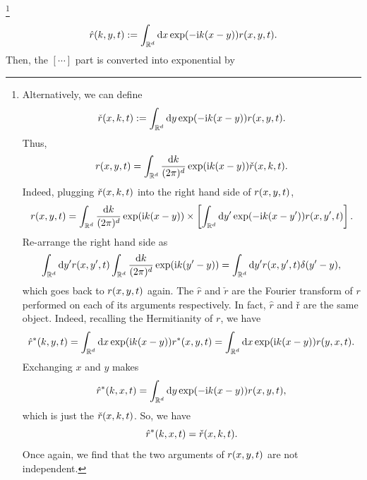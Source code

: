 \documentclass{book}
\newcommand{\assign}{:=}
\newcommand{\mathd}{\mathrm{d}}
\newcommand{\mathi}{\mathrm{i}}
\newcommand{\mathpi}{\pi}
\begin{document}
\footnote{Alternatively, we can define
\begin{equation}
  {\color[HTML]{000000}\check{r}  (x, k, t)} \assign \int_{\mathbb{R}^d}
  \mathd y \exp (- \mathi k (x - y)) {\color[HTML]{000000}r (x, y, t)} .
  \label{eq:r-fourier-alt}
\end{equation}
Thus,
\[ {\color[HTML]{000000}r (x, y, t)} = \int_{\mathbb{R}^d} \frac{\mathd k}{(2
   \mathpi)^d} \exp (\mathi k (x - y)) {\color[HTML]{000000}\check{r}  (x, k,
   t)} . \]
Indeed, plugging ${\color[HTML]{000000}\check{r}  (x, k, t)}$ into the right
hand side of ${\color[HTML]{000000}r (x, y, t)}$,
\[ {\color[HTML]{000000}r (x, y, t)} = \int_{\mathbb{R}^d} \frac{\mathd k}{(2
   \mathpi)^d} \exp (\mathi k (x - y)) \times \left[ \int_{\mathbb{R}^d}
   \mathd y' \exp (- \mathi k (x - y')) {\color[HTML]{000000}r (x, y', t)}
   \right] . \]
Re-arrange the right hand side as
\[ \int_{\mathbb{R}^d} \mathd y' {\color[HTML]{000000}r (x, y', t)}
   \int_{\mathbb{R}^d} \frac{\mathd k}{(2 \mathpi)^d} \exp (\mathi k (y' - y))
   = \int_{\mathbb{R}^d} \mathd y' {\color[HTML]{000000}r (x, y', t)} \delta
   (y' - y), \]
which goes back to ${\color[HTML]{000000}r (x, y, t)}$ again. The $\hat{r}$
and $\check{r}$ are the Fourier transform of $r$ performed on each of its
arguments respectively. In fact, $\hat{r}$ and ř are the same object. Indeed,
recalling the Hermitianity of $r$, we have
\[ {\color[HTML]{000000}\hat{r}^{\ast}  (k, y, t)} = \int_{\mathbb{R}^d}
   \mathd x \exp (\mathi k (x - y)) {\color[HTML]{000000}r^{\ast}  (x, y, t)}
   = \int_{\mathbb{R}^d} \mathd x \exp (\mathi k (x - y))
   {\color[HTML]{000000}r (y, x, t)} . \]
Exchanging $x$ and $y$ makes
\[ {\color[HTML]{000000}\hat{r}^{\ast}  (k, x, t)} = \int_{\mathbb{R}^d}
   \mathd y \exp (- \mathi k (x - y)) {\color[HTML]{000000}r (x, y, t)}, \]
which is just the ${\color[HTML]{000000}\check{r}  (x, k, t)}$. So, we have
\begin{equation}
  {\color[HTML]{000000}\hat{r}^{\ast}  (k, x, t)} =
  {\color[HTML]{000000}\check{r}  (x, k, t)} .
\end{equation}
Once again, we find that the two arguments of ${\color[HTML]{000000}r (x, y,
t)}$ are not independent.}
\begin{equation}
  {\color[HTML]{000000}\hat{r}  (k, y, t)} \assign \int_{\mathbb{R}^d} \mathd
  x \exp (- \mathi k (x - y)) {\color[HTML]{000000}r (x, y, t)} .
  \label{eq:hamiltonian}
\end{equation}
Then, the $[\cdots]$ part is converted into exponential by
\end{document}
